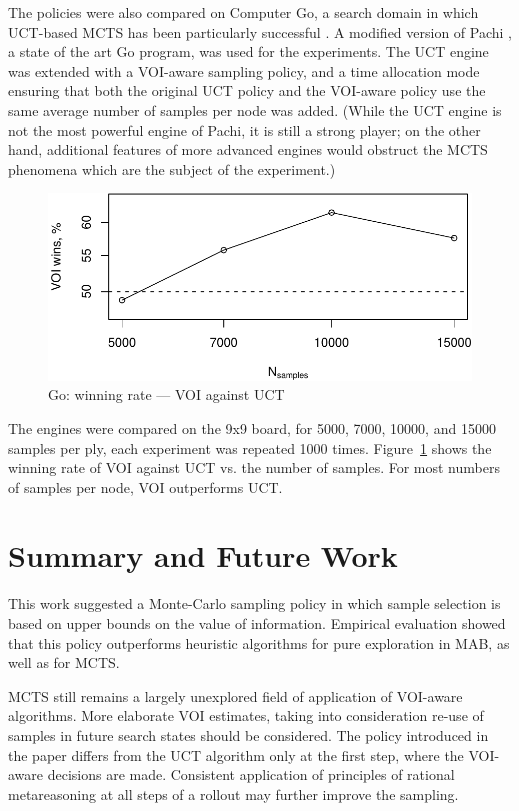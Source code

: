 \documentclass{ecai2012}
\begin{document}
The policies were also compared on Computer Go, a  search domain
in which UCT-based MCTS has been particularly successful
\cite{Gelly.mogo}. A modified version of Pachi \cite{Braudis.pachi}, a state of the art
Go program, was used for the experiments. The UCT engine was extended
with a VOI-aware sampling policy, and a time allocation mode ensuring
that both the original UCT policy and the VOI-aware policy use the
same average number of samples per node was added. (While the UCT
engine is not the most powerful engine of Pachi, it is still a strong
player; on the other hand, additional features of more advanced
engines would obstruct the MCTS phenomena which are the subject of
the experiment.)
\begin{figure}[h!]
\centering
\includegraphics[scale=0.6]{vct-wins.pdf}
\vspace{-8pt}
\caption{Go: winning rate --- VOI against UCT}
\label{fig:vct-against-uct}
\vspace{-16pt}
\end{figure}
The engines were compared on the 9x9 board, for 5000, 7000, 10000, and
15000 samples per ply, each experiment was repeated
1000 times. Figure~\ref{fig:vct-against-uct}
shows the winning rate of VOI against UCT vs. the number of
samples. For most numbers of samples per node, VOI outperforms UCT.

\section{Summary and Future Work}

This work suggested a Monte-Carlo sampling policy in which sample
selection is based on upper bounds on the value of
information. Empirical evaluation showed that this policy outperforms
heuristic algorithms for pure exploration in MAB, as well as for MCTS.

MCTS still remains a largely unexplored field of
application of VOI-aware algorithms. More elaborate VOI estimates,
taking into consideration re-use of samples in future search states
should be considered. The policy introduced in the paper differs from
the UCT algorithm only at the first step, where the VOI-aware
decisions are made. Consistent application of principles of rational
metareasoning at all steps of a rollout may further improve the
sampling.



\end{document}
